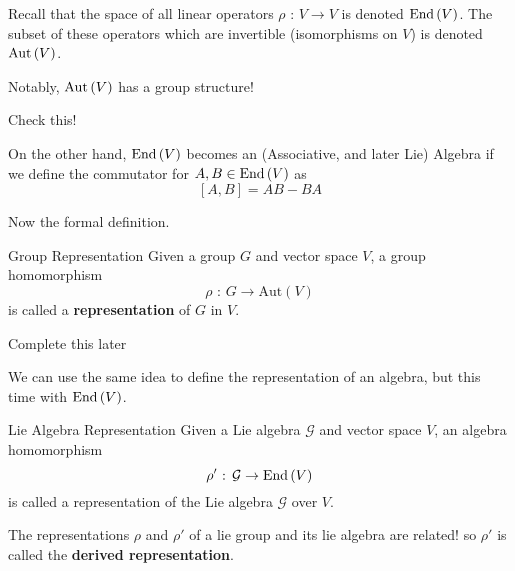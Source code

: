 \documentclass[11pt]{article}
\begin{document}
\vskip 0.5cm
\begin{redbox}
  Recall that the space of all linear operators $\rho \text{ : } V \rightarrow V$ is denoted $\mathrm{End}\left(V\right)$. The subset of these operators which are invertible (isomorphisms on $V$) is denoted $\mathrm{Aut}\left(V\right)$. 
  
  \vskip 0.5cm
  Notably, $\mathrm{Aut}\left(V\right)$ has a group structure! \begin{thought}{Check this!} \end{thought} On the other hand, $\mathrm{End}\left(V\right)$ becomes an (Associative, and later Lie) Algebra if we define the commutator for $A, B \in \mathrm{End}\left(V\right)$ as
  \[ [A, B] = AB - BA \] 
  
\end{redbox}

\vskip 0.5cm
Now the formal definition.

\vskip 0.5cm
\begin{definition}{Group Representation}
  Given a group $G$ and vector space $V$, a group homomorphism \[ \rho \text{ : } G \rightarrow \mathrm{Aut}(V) \] is called a \textbf{representation} of $G$ in $V$.
\end{definition}

\begin{example}
  Complete this later
\end{example}

\vskip 0.5cm

We can use the same idea to define the representation of an algebra, but this time with $\mathrm{End}\left(V\right)$.

\begin{definition}{Lie Algebra Representation}
  Given a Lie algebra $\mathcal{G}$ and vector space $V$, an algebra homomorphism \[ \rho' \text{ : } \mathcal{G} \rightarrow \mathrm{End}\left(V\right) \] is called a representation of the Lie algebra $\mathcal{G}$ over $V$.
\end{definition}

\begin{remark}{The representations $\rho$ and $\rho'$ of a lie group and its lie algebra are related! so $\rho'$ is called the \textbf{derived representation}.}
\end{remark}
\end{document}
